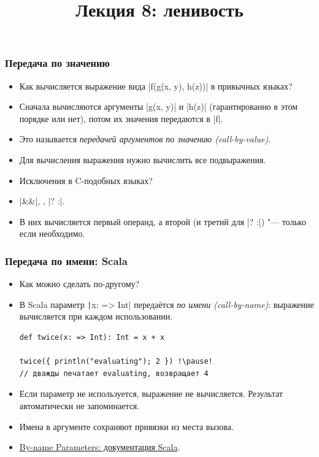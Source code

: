 \documentclass[11pt]{beamer}
\title{Лекция 8: ленивость}
\begin{document}
\begin{frame}[plain]
  \maketitle
\end{frame}

\begin{frame}[fragile]
  \frametitle{Передача по значению}
  \begin{itemize}
    \item Как вычисляется выражение вида \haskinline|f(g(x, y), h(z))| в привычных языках?
          \pause
    \item Сначала вычисляются аргументы \haskinline|g(x, y)| и \haskinline|h(z)| (гарантированно в этом порядке или нет), потом их значения передаются в \haskinline|f|.
    \item Это называется \emph{передачей аргументов по значению (call-by-value)}.
    \item Для вычисления выражения нужно вычислить все подвыражения.
    \item Исключения в C-подобных языках?
          \pause
    \item \haskinline|&&|, \haskinline{||}, \haskinline|? :|.
          \pause
    \item В них вычисляется первый операнд, а второй (и третий для \haskinline|? :|) "--- только если необходимо.
  \end{itemize}
\end{frame}

\begin{frame}[fragile]
  \frametitle{Передача по имени: Scala}
  \begin{itemize}
    \item Как можно сделать по-другому?
          \pause
    \item В Scala параметр \texttt|x: => Int| передаётся \emph{по имени (call-by-name)}: выражение вычисляется при каждом использовании.
          \begin{verbatim}
def twice(x: => Int): Int = x + x

twice({ println("evaluating"); 2 }) !\pause!
// дважды печатает evaluating, возвращает 4
          \end{verbatim}
          \pause
    \item Если параметр не используется, выражение не вычисляется. Результат автоматически не запоминается.
    \item Имена в аргументе сохраняют привязки из места вызова.
    \item \href{https://docs.scala-lang.org/tour/by-name-parameters.html}{By-name Parameters: документация Scala}.
  \end{itemize}
\end{frame}
\end{document}
